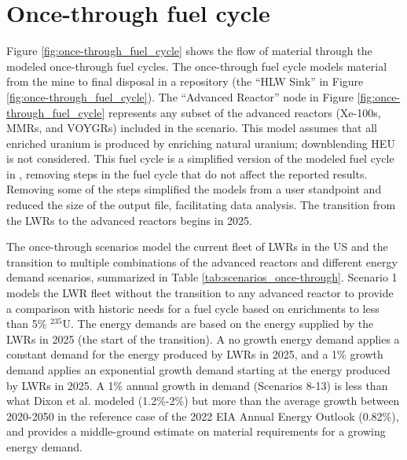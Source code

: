 \section{Once-through fuel cycle} \label{sec:once-through-methods}
Figure \ref{fig:once-through_fuel_cycle} shows the flow of material through 
the modeled once-through fuel cycles. The once-through fuel cycle models 
material from the mine to final disposal in a repository (the 
``HLW Sink'' in Figure \ref{fig:once-through_fuel_cycle}). The 
``Advanced Reactor'' node in Figure 
\ref{fig:once-through_fuel_cycle} represents any subset of the advanced 
reactors (Xe-100s, \glspl{MMR}, and VOYGRs) included 
in the scenario. This model assumes that all enriched uranium is produced 
by enriching natural uranium; downblending \gls{HEU} is not considered. 
This fuel cycle is a simplified version of the modeled fuel cycle in 
\cite{bachmann_enrichment_2021}, removing steps in the fuel cycle that 
do not affect the reported results. Removing some of the steps simplified 
the models from a user standpoint and reduced the size of the \Cyclus 
output file, facilitating data analysis. The transition from the 
\glspl{LWR} to the advanced reactors begins in 2025. 



The once-through scenarios model the current fleet of \glspl{LWR} in the 
US and the transition to multiple 
combinations of the advanced reactors and different energy demand scenarios, 
summarized in Table \ref{tab:scenarios_once-through}. Scenario 1 models
the \gls{LWR} fleet without the transition to any advanced reactor to 
provide 
a comparison with historic needs for a fuel cycle 
based on enrichments to less than 5\% $^{235}$U. The energy demands are 
based on the energy supplied by the \glspl{LWR} in 2025 (the start of 
the transition). A no growth energy demand applies a constant demand for 
the energy produced by \glspl{LWR} in 2025, and a 1\% growth demand applies 
an exponential growth demand starting at the energy produced by 
\glspl{LWR} in 2025. A 1\% annual growth in 
demand (Scenarios 8-13) is less than what Dixon et al. \cite{dixon_estimated_2022} 
modeled
(1.2\%-2\%) but more than the average growth between 2020-2050 in the 
reference case of the 2022 \gls{EIA} Annual Energy Outlook 
\cite{us_energy_information_administration_annual_2022} (0.82\%), and 
provides a middle-ground estimate on material requirements for a growing 
energy demand. 

